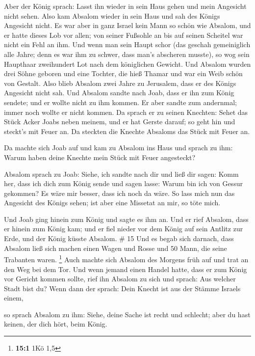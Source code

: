  Aber der König sprach: Lasst ihn wieder in sein Haus gehen
und mein Angesicht nicht sehen. Also kam Absalom wieder in sein Haus und
sah des Königs Angesicht nicht.  Es war aber in ganz Israel
kein Mann so schön wie Absalom, und er hatte dieses Lob vor allen; von
seiner Fußsohle an bis auf seinen Scheitel war nicht ein Fehl an ihm.
 Und wenn man sein Haupt schor (das geschah gemeiniglich
alle Jahre; denn es war ihm zu schwer, dass man's abscheren musste), so
wog sein Haupthaar zweihundert Lot nach dem königlichen Gewicht.
 Und Absalom wurden drei Söhne geboren und eine Tochter,
die hieß Thamar und war ein Weib schön von Gestalt.  Also
blieb Absalom zwei Jahre zu Jerusalem, dass er des Königs Angesicht
nicht sah.  Und Absalom sandte nach Joab, dass er ihn zum
König sendete; und er wollte nicht zu ihm kommen. Er aber sandte zum
andernmal; immer noch wollte er nicht kommen.  Da sprach er
zu seinen Knechten: Sehet das Stück Acker Joabs neben meinem, und er hat
Gerste darauf; so geht hin und steckt's mit Feuer an. Da steckten die
Knechte Absaloms das Stück mit Feuer an.

 Da machte sich Joab auf und kam zu Absalom ins Haus und
sprach zu ihm: Warum haben deine Knechte mein Stück mit Feuer
angesteckt?

 Absalom sprach zu Joab: Siehe, ich sandte nach dir und
ließ dir sagen: Komm her, dass ich dich zum König sende und sagen lasse:
Warum bin ich von Gessur gekommen? Es wäre mir besser, dass ich noch da
wäre. So lass mich nun das Angesicht des Königs sehen; ist aber eine
Missetat an mir, so töte mich.

 Und Joab ging hinein zum König und sagte es ihm an. Und er
rief Absalom, dass er hinein zum König kam; und er fiel nieder vor dem
König auf sein Antlitz zur Erde, und der König küsste Absalom. \# 15
 Und es begab sich darnach, dass Absalom ließ sich machen
einen Wagen und Rosse und 50 Mann, die seine Trabanten waren.
\footnote{\textbf{15:1} 1Kö 1,5}  Auch machte sich Absalom
des Morgens früh auf und trat an den Weg bei dem Tor. Und wenn jemand
einen Handel hatte, dass er zum König vor Gericht kommen sollte, rief
ihn Absalom zu sich und sprach: Aus welcher Stadt bist du? Wenn dann der
sprach: Dein Knecht ist aus der Stämme Israels einem,

 so sprach Absalom zu ihm: Siehe, deine Sache ist recht und
schlecht; aber du hast keinen, der dich hört, beim König.

